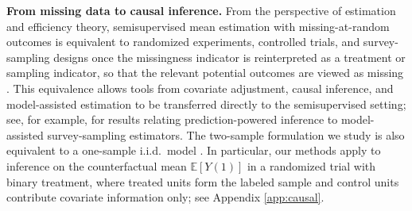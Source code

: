 \documentclass{article}
\theoremstyle{plain}
\theoremstyle{definition}
\newcommand{\1}{\mathbf{1}}
\begin{document}
\textbf{From missing data to causal inference.} From the perspective of estimation and efficiency theory, semisupervised mean estimation with missing-at-random outcomes is equivalent to randomized experiments, controlled trials, and survey-sampling designs once the missingness indicator is reinterpreted as a treatment or sampling indicator, so that the relevant potential outcomes are viewed as missing \citep{rubin1978bayesian,vanderlaanunified,licausal,mozer2026ppi}. This equivalence allows tools from covariate adjustment, causal inference, and model-assisted estimation to be transferred directly to the semisupervised setting; see, for example, \citet{mozer2026ppi} for results relating prediction-powered inference to model-assisted survey-sampling estimators. The two-sample formulation we study is also equivalent to a one-sample i.i.d.\ model \citep{li2023efficient}. In particular, our methods apply to inference on the counterfactual mean \(\mathbb{E}[Y(1)]\) in a randomized trial with binary treatment, where treated units form the labeled sample and control units contribute covariate information only; see Appendix \ref{app:causal}.
\end{document}
